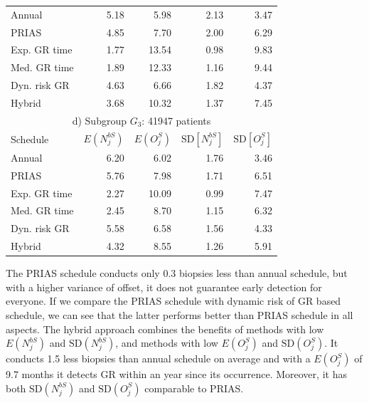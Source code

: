 \begin{table}
\begin{tabular}{lrrrr}
\hline
Annual         & 5.18            & 5.98                & 2.13          & 3.47              \\
PRIAS          & 4.85            & 7.70                & 2.00          & 6.29        \\
Exp. GR time & 1.77            & 13.54               & 0.98          & 9.83              \\
Med. GR time & 1.89             & 12.33               & 1.16          & 9.44              \\
Dyn. risk GR       & 4.63            & 6.66                & 1.82          & 4.37              \\
Hybrid       & 3.68            & 10.32                & 1.37          & 7.45              \\
\hline      
\multicolumn{5}{c}{d) Subgroup $G_3$: 41947 patients}\\
\hline
Schedule        & $E(N^{bS}_j)$ & $E(O^S_j)$ & ${\mbox{SD}[N^{bS}_j]}$ & ${\mbox{SD}[O^S_j]}$ \\
\hline
Annual         & 6.20             & 6.02                & 1.76          & 3.46              \\
PRIAS          & 5.76             & 7.98                & 1.71         & 6.51        \\
Exp. GR time & 2.27            & 10.09               & 0.99          & 7.47              \\
Med. GR time & 2.45            & 8.70                & 1.15          & 6.32              \\
Dyn. risk GR       & 5.58            & 6.58                & 1.56          & 4.33              \\
Hybrid       & 4.32            & 8.55                & 1.26          & 5.91              \\
\hline     
\end{tabular}
\end{table}

The PRIAS schedule conducts only 0.3 biopsies less than annual schedule, but with a higher variance of offset, it does not guarantee early detection for everyone. If we compare the PRIAS schedule with dynamic risk of GR based schedule, we can see that the latter performs better than PRIAS schedule in all aspects. The hybrid approach combines the benefits of methods with low $E(N^{bS}_j)$ and $\mbox{SD}(N^{bS}_j)$, and methods with low $E(O^S_j)$ and $\mbox{SD}(O^S_j)$. It conducts 1.5 less biopsies than annual schedule on average and with a $E(O^S_j)$ of 9.7 months it detects GR within an year since its occurrence. Moreover, it has both $\mbox{SD}(N^{bS}_j)$ and $\mbox{SD}(O^S_j)$ comparable to PRIAS.

